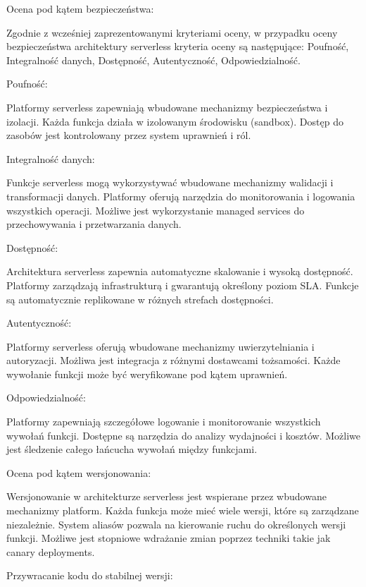 \documentclass[runningheads,12pt]{llncs}
\begin{document}
Ocena pod kątem bezpieczeństwa:

Zgodnie z wcześniej zaprezentowanymi kryteriami oceny, w przypadku oceny bezpieczeństwa architektury serverless kryteria oceny są następujące: Poufność, Integralność danych, Dostępność, Autentyczność, Odpowiedzialność.

Poufność: 

Platformy serverless zapewniają wbudowane mechanizmy bezpieczeństwa i izolacji. Każda funkcja działa w izolowanym środowisku (sandbox). Dostęp do zasobów jest kontrolowany przez system uprawnień i ról. ~\cite[p. 167]{roberts2018cloud}

Integralność danych: 

Funkcje serverless mogą wykorzystywać wbudowane mechanizmy walidacji i transformacji danych. Platformy oferują narzędzia do monitorowania i logowania wszystkich operacji. Możliwe jest wykorzystanie managed services do przechowywania i przetwarzania danych. ~\cite[p. 189]{roberts2018cloud}

Dostępność: 

Architektura serverless zapewnia automatyczne skalowanie i wysoką dostępność. Platformy zarządzają infrastrukturą i gwarantują określony poziom SLA. Funkcje są automatycznie replikowane w różnych strefach dostępności. ~\cite[p. 198]{roberts2018cloud}

Autentyczność: 

Platformy serverless oferują wbudowane mechanizmy uwierzytelniania i autoryzacji. Możliwa jest integracja z różnymi dostawcami tożsamości. Każde wywołanie funkcji może być weryfikowane pod kątem uprawnień. ~\cite[p. 223]{roberts2018cloud}

Odpowiedzialność: 

Platformy zapewniają szczegółowe logowanie i monitorowanie wszystkich wywołań funkcji. Dostępne są narzędzia do analizy wydajności i kosztów. Możliwe jest śledzenie całego łańcucha wywołań między funkcjami. ~\cite[p. 245]{roberts2018cloud}

Ocena pod kątem wersjonowania:

Wersjonowanie w architekturze serverless jest wspierane przez wbudowane mechanizmy platform. Każda funkcja może mieć wiele wersji, które są zarządzane niezależnie. System aliasów pozwala na kierowanie ruchu do określonych wersji funkcji. Możliwe jest stopniowe wdrażanie zmian poprzez techniki takie jak canary deployments. ~\cite[p. 267]{roberts2018cloud}

Przywracanie kodu do stabilnej wersji: 
\end{document}
